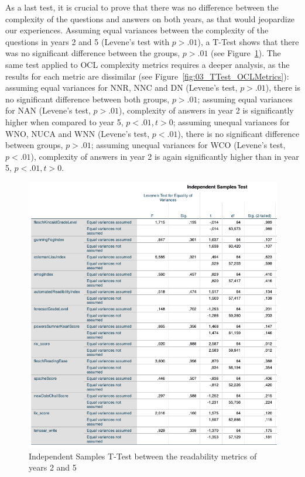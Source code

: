 As a last test, it is crucial to prove that there was no difference between the complexity of the questions and answers on both years, as that would jeopardize our experiences. Assuming equal variances between the complexity of the questions in years 2 and 5 (Levene's test with $p>.01$), a T-Test shows that there was no significant difference between the groups, $p>.01$ (see Figure~\ref{fig:03_TTest_NLMetrics}). The same test applied to OCL complexity metrics requires a deeper analysis, as the results for each metric are dissimilar (see Figure~\ref{fig:03_TTest_OCLMetrics}): assuming equal variances for NNR, NNC and DN (Levene's test, $p>.01$), there is no significant difference between both groups, $p>.01$; assuming equal variances for NAN (Levene's test, $p>.01$), complexity of answers in year 2 is significantly higher when compared to year 5, $p<.01, t>0$; assuming unequal variances for WNO, NUCA and WNN (Levene's test, $p<.01$), there is no significant difference between groups, $p>.01$; assuming unequal variances for WCO (Levene's test, $p<.01$), complexity of answers in year 2 is again significantly higher than in year 5, $p<.01, t>0$. 

\begin{figure}[ht]
\centering
\includegraphics[width=1\textwidth]{Template/Chapters/figures/6_Results/Section3/03_TTest_NLMetrics.png}
\caption{Independent Samples T-Test between the readability metrics of years 2 and 5}
\label{fig:03_TTest_NLMetrics}
\end{figure}

